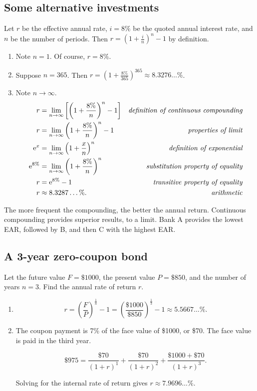 \documentclass[12pt]{article}
\begin{document}
\subsection{Some alternative investments}
Let $r$ be the effective annual rate, $i=8\%$ be the quoted annual interest rate, and $n$ be the number of periods. Then $r=\left(1+\frac{i}{n}\right)^n-1$ by definition.
\begin{enumerate}
\item Note $n=1$. Of course, $r=8\%$.
\item Suppose $n=365$. Then $r=\left(1+\frac{8\%}{365}\right)^{365}\approx 8.3276\dots\%$.
\item Note $n\to\infty$.
\begin{align*}
r&=\lim_{n\to\infty}{\left[\left(1+\frac{8\%}{n}\right)^n-1\right]}&\textit{definition of continuous compounding}\\
r&=\lim_{n\to\infty}{\left(1+\frac{8\%}{n}\right)^n}-1&\textit{properties of limit}\\
{\rm e}^x&=\lim_{n\to\infty}{\left(1+\frac{x}{n}\right)^n}&\textit{definition of exponential}\\
{\rm e}^{8\%}&=\lim_{n\to\infty}{\left(1+\frac{8\%}{n}\right)^n}&\textit{substitution property of equality}\\
r&={\rm e}^{8\%}-1&\textit{transitive property of equality}\\
r&\approx 8.3287\dots\%.&\textit{arithmetic}
\end{align*}
\end{enumerate}
The more frequent the compounding, the better the annual return. Continuous compounding provides superior results, to a limit. Bank A provides the lowest EAR, followed by B, and then C with the highest EAR.
\subsection{A 3-year zero-coupon bond}
Let the future value $F=\$1000$, the present value $P=\$850$, and the number of years $n=3$. Find the annual rate of return $r$.
\begin{enumerate}
\item
\[r=\left(\frac{F}{P}\right)^{\frac{1}{n}}-1=\left(\frac{\$1000}{\$850}\right)^{\frac{1}{3}}-1\approx 5.5667\dots\%.\]
\item The coupon payment is 7\% of the face value of \$1000, or \$70. The face value is paid in the third year.

\[\$975=\frac{\$70}{(1+r)^1}+\frac{\$70}{(1+r)^2}+\frac{\$1000+\$70}{(1+r)^3}.\]

Solving for the internal rate of return gives $r\approx 7.9696\dots\%$.
\end{enumerate}
\end{document}
